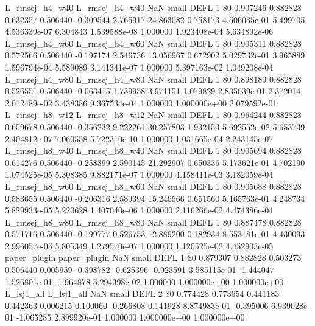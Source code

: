 L_rmsej_h4_w40 L_rmsej_h4_w40                   NaN      small     DEFL                 1 80 0.907246       0.882828 0.632357       0.506440   -0.309544      2.765917     24.863082     0.758173   4.506035e-01  5.499705 4.536339e-07     6.304843   1.539588e-08            1.000000    1.923408e-04        5.634892e-06
L_rmsej_h4_w60 L_rmsej_h4_w60                   NaN      small     DEFL                 1 80 0.905311       0.882828 0.572566       0.506440   -0.197174      2.546736     13.056967     0.672902   5.029732e-01  3.965889 1.596794e-04     5.589089   3.141341e-07            1.000000    5.397163e-02        1.049208e-04
L_rmsej_h4_w80 L_rmsej_h4_w80                   NaN      small     DEFL                 1 80 0.898189       0.882828 0.526551       0.506440   -0.063415      1.739958      3.971151     1.079829   2.835039e-01  2.372014 2.012489e-02     3.438386   9.367534e-04            1.000000    1.000000e+00        2.079592e-01
L_rmsej_h8_w12 L_rmsej_h8_w12                   NaN      small     DEFL                 1 80 0.964244       0.882828 0.659678       0.506440   -0.356232      9.222261     30.257803     1.932153   5.692552e-02  5.653739 2.404812e-07     7.060558   5.722310e-10            1.000000    1.031665e-04        2.243145e-07
L_rmsej_h8_w40 L_rmsej_h8_w40                   NaN      small     DEFL                 1 80 0.905694       0.882828 0.614276       0.506440   -0.258399      2.590145     21.292907     0.650336   5.173621e-01  4.702190 1.074525e-05     5.308385   9.882171e-07            1.000000    4.158411e-03        3.182059e-04
L_rmsej_h8_w60 L_rmsej_h8_w60                   NaN      small     DEFL                 1 80 0.905688       0.882828 0.583655       0.506440   -0.206316      2.589394     15.246566     0.651560   5.165763e-01  4.248734 5.829933e-05     5.220628   1.407040e-06            1.000000    2.116266e-02        4.474386e-04
L_rmsej_h8_w80 L_rmsej_h8_w80                   NaN      small     DEFL                 1 80 0.887478       0.882828 0.571716       0.506440   -0.199777      0.526753     12.889200     0.182934   8.553181e-01  4.430093 2.996057e-05     5.805349   1.279570e-07            1.000000    1.120525e-02        4.452903e-05
  paper_plugin   paper_plugin                   NaN      small     DEFL                 1 80 0.879307       0.882828 0.503273       0.506440    0.005959     -0.398782     -0.625396    -0.923591   3.585115e-01 -1.444047 1.526801e-01    -1.964878   5.294398e-02            1.000000    1.000000e+00        1.000000e+00
    L_lsj1_all     L_lsj1_all                   NaN      small     DEFL                 2 80 0.774428       0.773654 0.441183       0.442363    0.006215      0.100060     -0.266808     0.141928   8.874983e-01 -0.395006 6.939028e-01    -1.065285   2.899920e-01            1.000000    1.000000e+00        1.000000e+00
